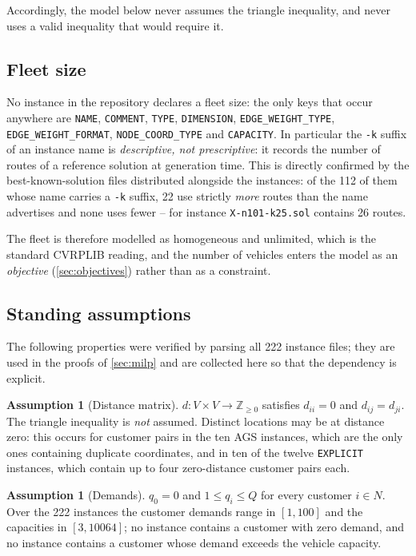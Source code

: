 \documentclass[11pt,a4paper]{article}
\theoremstyle{definition}
\newtheorem{assumption}[definition]{Assumption}
\theoremstyle{plain}
\newcommand{\Z}{\mathbb{Z}}
\newcommand{\Cust}{N}
\newcommand{\Nodes}{V}
\begin{document}
Accordingly, the model below never assumes the triangle inequality, and never
uses a valid inequality that would require it.

\subsection{Fleet size}
\label{sec:fleet}

No instance in the repository declares a fleet size: the only keys that occur
anywhere are \texttt{NAME}, \texttt{COMMENT}, \texttt{TYPE},
\texttt{DIMENSION}, \texttt{EDGE\_WEIGHT\_TYPE},
\texttt{EDGE\_WEIGHT\_FORMAT}, \texttt{NODE\_COORD\_TYPE} and
\texttt{CAPACITY}.  In particular the \texttt{-k} suffix of an instance name is
\emph{descriptive, not prescriptive}: it records the number of routes of a
reference solution at generation time.  This is directly confirmed by the best-known-solution files distributed
alongside the instances: of the \num{112} of them whose name carries a
\texttt{-k} suffix, \num{22} use strictly \emph{more} routes than the name
advertises and none uses fewer -- for instance \texttt{X-n101-k25.sol}
contains \num{26} routes.

The fleet is therefore modelled as homogeneous and unlimited, which is the
standard CVRPLIB reading, and the number of vehicles enters the model as an
\emph{objective} (\cref{sec:objectives}) rather than as a constraint.

\subsection{Standing assumptions}

The following properties were verified by parsing all \num{222} instance files;
they are used in the proofs of \cref{sec:milp} and are collected here so that
the dependency is explicit.

\begin{assumption}[Distance matrix]
\label{as:dist}
$d : \Nodes \times \Nodes \to \Z_{\ge 0}$ satisfies $d_{ii} = 0$ and
$d_{ij} = d_{ji}$.  The triangle inequality is \emph{not} assumed.  Distinct
locations may be at distance zero: this occurs for customer pairs in the ten
\textsf{AGS} instances, which are the only ones containing duplicate
coordinates, and in ten of the twelve \texttt{EXPLICIT} instances, which
contain up to four zero-distance customer pairs each.
\end{assumption}

\begin{assumption}[Demands]
\label{as:demand}
$q_0 = 0$ and $1 \le q_i \le Q$ for every customer $i \in \Cust$.  Over the
\num{222} instances the customer demands range in $[1,100]$ and the capacities
in $[3,\num{10064}]$; no instance contains a customer with zero demand, and no
instance contains a customer whose demand exceeds the vehicle capacity.
\end{assumption}
\end{document}
